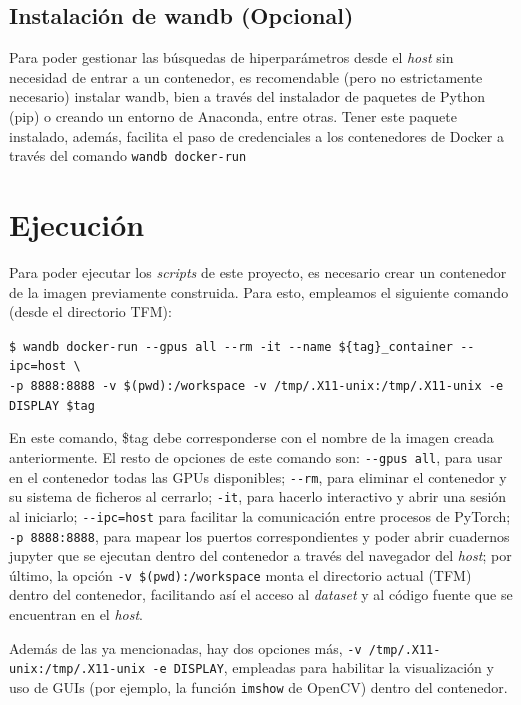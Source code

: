\subsection{Instalación de wandb (Opcional)}

Para poder gestionar las búsquedas de hiperparámetros desde el \textit{host} sin necesidad de entrar a un contenedor, es recomendable (pero no estrictamente necesario) instalar wandb, bien a través del instalador de paquetes de Python (pip) o creando un entorno de Anaconda, entre otras. Tener este paquete instalado, además, facilita el paso de credenciales a los contenedores de Docker a través del comando \texttt{wandb docker{-}run}

\section{Ejecución}

Para poder ejecutar los \textit{scripts} de este proyecto, es necesario crear un contenedor de la imagen previamente construida. Para esto, empleamos el siguiente comando (desde el directorio TFM):

\texttt{\$ wandb docker{-}run {-}{-}gpus all {-}{-}rm {-}it {-}{-}name \$\{tag\}{\_}container 
{-}{-}ipc=host \textbackslash \\ 
{-}p 8888:8888 {-}v \$(pwd):/workspace {-}v /tmp/.X11{-}unix:/tmp/.X11{-}unix {-}e DISPLAY \$tag}

En este comando, \$tag debe corresponderse con el nombre de la imagen creada anteriormente. El resto de opciones de este comando son: \texttt{{-}{-}gpus all}, para usar en el contenedor todas las GPUs disponibles; \texttt{{-}{-}rm}, para eliminar el contenedor y su sistema de ficheros al cerrarlo; \texttt{{-}it}, para hacerlo interactivo y abrir una sesión al iniciarlo; \texttt{{-}{-}ipc=host} para facilitar la comunicación entre procesos de PyTorch; \texttt{{-}p 8888:8888}, para mapear los puertos correspondientes y poder abrir cuadernos jupyter que se ejecutan dentro del contenedor a través del navegador del \textit{host}; por último, la opción \texttt{{-}v \$(pwd):/workspace} monta el directorio actual (TFM) dentro del contenedor, facilitando así el acceso al \textit{dataset} y al código fuente que se encuentran en el \textit{host}.

Además de las ya mencionadas, hay dos opciones más, \texttt{{-}v /tmp/.X11{-}unix:/tmp/.X11{-}unix {-}e DISPLAY}, empleadas para habilitar la visualización y uso de GUIs (por ejemplo, la función \texttt{imshow} de OpenCV) dentro del contenedor.

